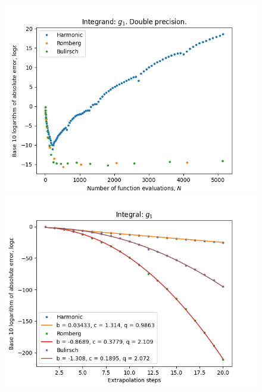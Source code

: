 \begin{figure}[H]
\centering
\begin{minipage}{0.45\textwidth}
\centering
\includegraphics[scale=0.45]{romberg_plots/g_one.png}
\end{minipage}
\begin{minipage}{0.45\textwidth}
\centering
\includegraphics[scale=0.45]{romberg_plots/g_one_hp_steps.png}
\end{minipage}
\end{figure}

